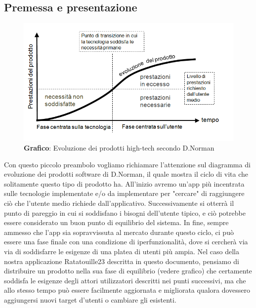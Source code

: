 \subsection{Premessa e presentazione}
    \begin{figure}[H]
        \centering
        \includegraphics[scale=0.5]{assets/immagini varie/D.Norman grafico.png}
        \caption{\textbf{Grafico}: Evoluzione dei prodotti high-tech secondo D.Norman}\label{fig:Mockup_Homepage}
    \end{figure}

    \begin{flushleft}
        Con questo piccolo preambolo vogliamo richiamare l'attenzione sul diagramma di evoluzione dei prodotti software di D.Norman,
        il quale mostra il ciclo di vita che solitamente questo tipo di prodotto ha.
        All'inizio avremo un'app più incentrata sulle tecnologie implementate e/o da implementare per "cercare" di
        raggiungere ciò che l'utente medio richiede dall'applicativo. Successivamente si otterrà il punto di pareggio in cui si soddisfano
        i bisogni dell'utente tipico, e ciò potrebbe essere considerato un buon punto di equilibrio del sistema.
        In fine, sempre ammesso che l'app sia sopravvissuta al mercato durante questo ciclo, ci può essere una fase finale con una condizione
        di iperfunzionalità, dove si cercherà via via di soddisfarre le esigenze di una platea di utenti più ampia.
        Nel caso della nostra applicazione Ratatouille23 descritta in questo documento, pensiamo di distribuire un prodotto nella sua 
        fase di equilibrio (vedere grafico) che certamente soddisfa le esigenze degli attori utilizzatori descritti nei punti successivi, 
        ma che allo stesso tempo può essere facilmente aggiornata e migliorata qualora dovessero aggiungersi nuovi target d'utenti o cambiare
        gli esistenti.
    \end{flushleft}
 